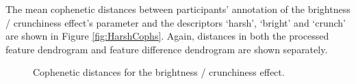 			The mean cophenetic distances between participants' annotation of the brightness / crunchiness
			effect's parameter and the descriptors `harsh', `bright' and `crunch' are shown in Figure
			\ref{fig:HarshCophs}. Again, distances in both the processed feature dendrogram and
			feature difference dendrogram are shown separately.

			\begin{figure}[h!]
				\centering
				\quad
				\caption{Cophenetic distances for the brightness / crunchiness effect.}
				\label{fig:CrunchCophs}
			\end{figure}

